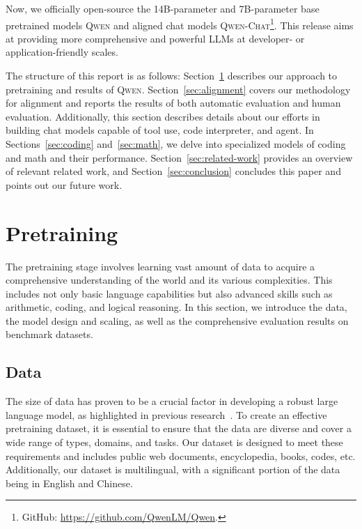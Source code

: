Now, we officially open-source the 14B-parameter and 7B-parameter base pretrained models \textsc{Qwen} and aligned chat models \textsc{Qwen-Chat}\footnote{GitHub: \url{https://github.com/QwenLM/Qwen}.}. 
This release aims at providing more comprehensive and powerful LLMs at developer- or application-friendly scales.

The structure of this report is as follows: Section~\ref{sec:pretraining} describes our approach to pretraining and results of \textsc{Qwen}. Section~\ref{sec:alignment} covers our methodology for alignment and reports the results of both automatic evaluation and human evaluation. Additionally, this section describes details about our efforts in building chat models capable of tool use, code interpreter, and agent. In Sections~\ref{sec:coding} and~\ref{sec:math}, we delve into specialized models of coding and math and their performance. Section~\ref{sec:related-work} provides an overview of relevant related work, and Section~\ref{sec:conclusion} concludes this paper and points out our future work.

\section{Pretraining}
\label{sec:pretraining}

The pretraining stage involves learning vast amount of data to acquire a comprehensive understanding of the world and its various complexities. This includes not only basic language capabilities but also advanced skills such as arithmetic, coding, and logical reasoning. In this section, we introduce the data, the model design and scaling, as well as the comprehensive evaluation results on benchmark datasets. 

\subsection{Data}
The size of data has proven to be a crucial factor in developing a robust large language model, as highlighted in previous research~\citep{chinchilla, llama2}. To create an effective pretraining dataset, it is essential to ensure that the data are diverse and cover a wide range of types, domains, and tasks. Our dataset is designed to meet these requirements and includes public web documents, encyclopedia, books, codes, etc. Additionally, our dataset is multilingual, with a significant portion of the data being in English and Chinese. 

